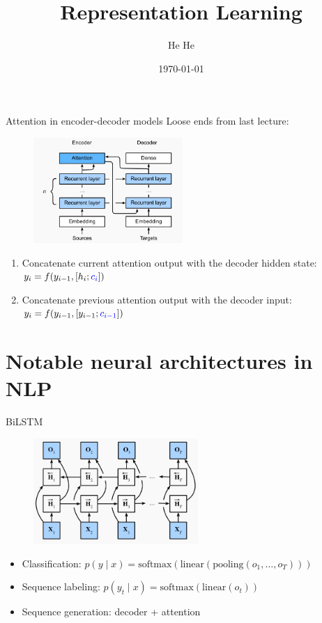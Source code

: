 \documentclass[usenames,dvipsnames,notes]{beamer}
\title[CSCI-GA.2590]{Representation Learning}
\author[He He]{He He
}
\institute[NYU]{New York University}
\date{\today}
\begin{document}
\begin{frame}
\titlepage
\end{frame}

\begin{frame}
    {Attention in encoder-decoder models}
    Loose ends from last lecture:
    \begin{figure}
        \includegraphics[height=4cm]{figures/s2s-attention}
    \end{figure}
    \vspace{-1em}
    \begin{enumerate}
        \item Concatenate current attention output with the decoder hidden state: 
            $y_i = f(y_{i-1}, [h_i; {\color{blue}c_i}])$
        \item Concatenate previous attention output with the decoder input: 
            $y_i = f(y_{i-1}, [y_{i-1}; {\color{blue}c_{i-1}}])$
    \end{enumerate}
\end{frame}

\section{Notable neural architectures in NLP}

\begin{frame}
    {BiLSTM}
    \begin{figure}
        \includegraphics[height=4cm]{figures/bilstm}
    \end{figure}
    \begin{itemize}
        \item Classification: $p(y\mid x) = \text{softmax}(\text{linear}(\text{pooling}(o_1,\ldots,o_T)))$
        \item Sequence labeling: $p(y_t\mid x) = \text{softmax}(\text{linear}(o_t))$
        \item Sequence generation: decoder + attention
    \end{itemize}
\end{frame}
\end{document}
